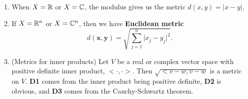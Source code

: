 \begin{example}
    \begin{enumerate}
        \item When $X = \mathbb{R}$ or $X = \mathbb{C}$, the modulus gives us the metric $d(x, y) = \lvert x - y \rvert$.
        \item If $X = \mathbb{R}^n$ or $X = \mathbb{C}^n$, then we have \textbf{Euclidean metric} 
            \[ d(\bm x, \bm y) = \sqrt{\sum_{j = 1}^n \lvert x_j - y_j \rvert^2}. \]
        \item (Metrics for inner products) Let $V$ be a real or complex vector space with positive definite inner product, $< \cdot, \cdot>$. Then $\sqrt{<v - w, v - w}$ is a metric on $V$. \textbf{D1} comes from the inner product being positive definite, \textbf{D2} is obvious, and \textbf{D3} comes from the Cauchy-Schwartz theorem.
    \end{enumerate}
\end{example}
